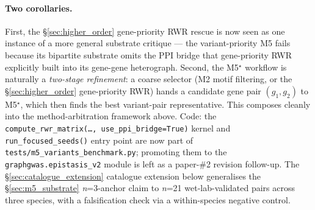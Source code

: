 \paragraph{Two corollaries.}
First, the §\ref{sec:higher_order} gene-priority RWR rescue is now
seen as one instance of a more general substrate critique --- the
variant-priority M5 fails because its bipartite substrate omits the
PPI bridge that gene-priority RWR explicitly built into its gene-gene
heterograph. Second, the M5$^\star$ workflow is naturally a
\emph{two-stage refinement}: a coarse selector (M2 motif filtering, or
the §\ref{sec:higher_order} gene-priority RWR) hands a candidate gene
pair $(g_1,g_2)$ to M5$^\star$, which then finds the best variant-pair
representative. This composes cleanly into the method-arbitration
framework above. Code: the
\texttt{compute\_rwr\_matrix(\dots,~use\_ppi\_bridge=True)} kernel and
\texttt{run\_focused\_seeds()} entry point are now part of
\texttt{tests/m5\_variants\_benchmark.py}; promoting them to the
\texttt{graphgwas.epistasis\_v2} module is left as a paper-\#2 revision
follow-up. The §\ref{sec:catalogue_extension} catalogue extension below
generalises the §\ref{sec:m5_substrate} \emph{n}=3-anchor claim to
\emph{n}=21 wet-lab-validated pairs across three species, with a
falsification check via a within-species negative control.

